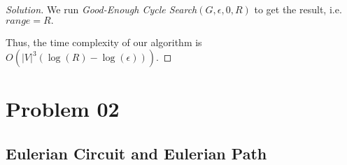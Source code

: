 \documentclass{article}
\newenvironment{solution}{\begin{proof}[\noindent\it Solution]}{\end{proof}}
\begin{document}
\begin{solution}
    \hspace{2.6em}
    We run \textit{Good-Enough Cycle Search}$(G,\epsilon,0,R)$ to get the result, i.e. $range=R.$
    
    \vspace{1em} \hspace{2.6em}
    Thus, the time complexity of our algorithm is $O\left(|V|^3\left(\log(R)-\log(\epsilon)\right)\right).$
\end{solution}

\vspace{1em}
\section{Problem 02}
\vspace{1em}

\subsection{Eulerian Circuit and Eulerian Path}
\end{document}
